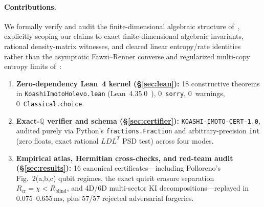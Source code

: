 \documentclass[11pt,twocolumn]{article}
\newcommand{\QQ}{\mathbb{Q}}
\begin{document}
\paragraph{Contributions.}
We formally verify and audit the finite-dimensional algebraic structure of~\cite{polloreno2026koashi}, explicitly scoping our claims to exact finite-dimensional algebraic invariants, rational density-matrix witnesses, and cleared linear entropy/rate identities rather than the asymptotic Fawzi--Renner converse and regularized multi-copy entropy limits of~\cite{polloreno2026koashi}:
\begin{enumerate}[leftmargin=*,nosep]
  \item \textbf{Zero-dependency Lean~4 kernel (\S\ref{sec:lean}):} 18 constructive theorems in \texttt{KoashiImotoHolevo.lean} (Lean~4.35.0~\cite{demoura2021lean4}), 0~\texttt{sorry}, 0~warnings, 0~\texttt{Classical.choice}.
  \item \textbf{Exact-$\QQ$ verifier and schema (\S\ref{sec:certifier}):} \texttt{KOASHI-IMOTO-CERT-1.0}, audited purely via Python's \texttt{fractions.Fraction} and arbitrary-precision \texttt{int} (zero floats, exact rational $LDL^T$ PSD test) across four modes.
  \item \textbf{Empirical atlas, Hermitian cross-checks, and red-team audit (\S\ref{sec:results}):} 16 canonical certificates—including Polloreno's Fig.~2(a,b,c) qubit regimes, the exact qutrit erasure separation $R_{\mathrm{cr}} = \chi < R_{\mathrm{blind}}$, and 4D/6D multi-sector KI decompositions—replayed in $0.075$--$0.655\,\mathrm{ms}$, plus 57/57 rejected adversarial forgeries.
\end{enumerate}
\end{document}
